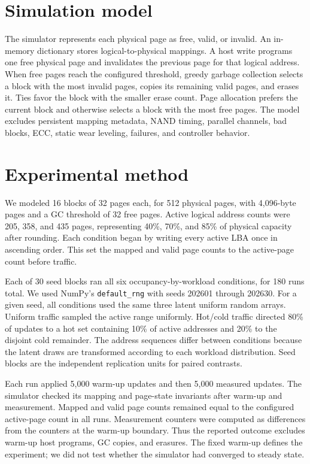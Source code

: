 \documentclass[11pt]{article}
\begin{document}
\section{Simulation model}
The simulator represents each physical page as free, valid, or invalid. An in-memory dictionary stores logical-to-physical mappings. A host write programs one free physical page and invalidates the previous page for that logical address. When free pages reach the configured threshold, greedy garbage collection selects a block with the most invalid pages, copies its remaining valid pages, and erases it. Ties favor the block with the smaller erase count. Page allocation prefers the current block and otherwise selects a block with the most free pages. The model excludes persistent mapping metadata, NAND timing, parallel channels, bad blocks, ECC, static wear leveling, failures, and controller behavior.

\section{Experimental method}
We modeled 16 blocks of 32 pages each, for 512 physical pages, with 4,096-byte pages and a GC threshold of 32 free pages. Active logical address counts were 205, 358, and 435 pages, representing 40\%, 70\%, and 85\% of physical capacity after rounding. Each condition began by writing every active LBA once in ascending order. This set the mapped and valid page counts to the active-page count before traffic.

Each of 30 seed blocks ran all six occupancy-by-workload conditions, for 180 runs total. We used NumPy's \texttt{default\_rng} with seeds 202601 through 202630. For a given seed, all conditions used the same three latent uniform random arrays. Uniform traffic sampled the active range uniformly. Hot/cold traffic directed 80\% of updates to a hot set containing 10\% of active addresses and 20\% to the disjoint cold remainder. The address sequences differ between conditions because the latent draws are transformed according to each workload distribution. Seed blocks are the independent replication units for paired contrasts.

Each run applied 5,000 warm-up updates and then 5,000 measured updates. The simulator checked its mapping and page-state invariants after warm-up and measurement. Mapped and valid page counts remained equal to the configured active-page count in all runs. Measurement counters were computed as differences from the counters at the warm-up boundary. Thus the reported outcome excludes warm-up host programs, GC copies, and erasures. The fixed warm-up defines the experiment; we did not test whether the simulator had converged to steady state.
\end{document}
